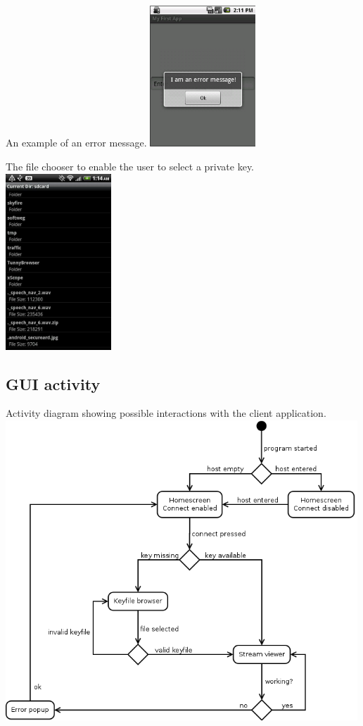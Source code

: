 \documentclass[a4paper,10pt]{scrartcl}
\begin{document}
\begin{illustration}{An example of an error message.}
\includegraphics[width=150px]{figures/images/error.png}
\end{illustration}
\begin{illustration}{The file chooser to enable the user to select a private key.}
\includegraphics[width=150px]{figures/images/fileChooser.png}
\end{illustration}

\subsection{GUI activity}
\begin{illustration}{Activity diagram showing possible interactions with the client application.}
\includegraphics [width=500px]{figures/gui_activity_1/gui_activity_1.png}
\end{illustration}
\end{document}
